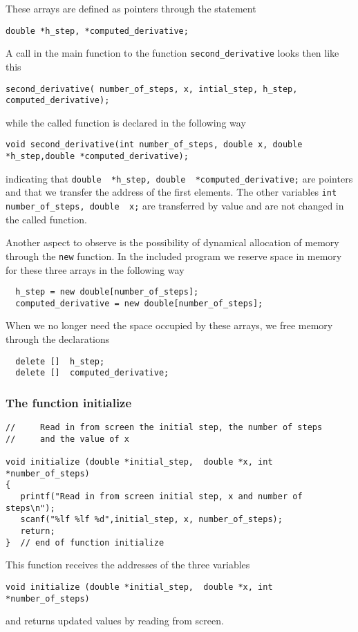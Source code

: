 These arrays are defined as pointers through the statement 
\begin{lstlisting}
double *h_step, *computed_derivative;
\end{lstlisting}
A call in the main function to the function 
\verb?second_derivative? 
looks then like this
\begin{lstlisting}
second_derivative( number_of_steps, x, intial_step, h_step, computed_derivative);
\end{lstlisting}
while the called function is declared in the following way
\begin{lstlisting}
void second_derivative(int number_of_steps, double x, double *h_step,double *computed_derivative);
\end{lstlisting}
indicating that
\verb?double  *h_step, double  *computed_derivative;?
are pointers and that we transfer the address of the first elements.
The other variables
\verb?int  number_of_steps, double  x;?
are transferred by value and are not changed in the called function.


Another aspect to observe is the possibility of dynamical allocation of 
memory through the \verb?new? function. In the included program we reserve
space in memory for these three arrays in the following way
\begin{lstlisting}
  h_step = new double[number_of_steps];
  computed_derivative = new double[number_of_steps];
\end{lstlisting}
When we no longer need the space occupied by these arrays, we free
memory through the declarations
\begin{lstlisting}
  delete []  h_step;
  delete []  computed_derivative;
\end{lstlisting}
\subsubsection{The function initialize}

\begin{lstlisting}
//     Read in from screen the initial step, the number of steps 
//     and the value of x 

void initialize (double *initial_step,  double *x, int *number_of_steps)
{
   printf("Read in from screen initial step, x and number of steps\n");
   scanf("%lf %lf %d",initial_step, x, number_of_steps);
   return;
}  // end of function initialize 
\end{lstlisting}

This function receives the addresses of the three variables 
\begin{lstlisting}
void initialize (double *initial_step,  double *x, int *number_of_steps)
\end{lstlisting}
and returns updated values by reading from screen.

